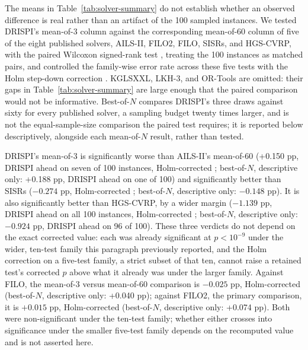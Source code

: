 The means in Table~\ref{tab:solver-summary} do not establish whether an observed difference is real rather than an artifact of the 100 sampled instances. We tested DRISPI's mean-of-3 column against the corresponding mean-of-60 column of five of the eight published solvers, AILS-II, FILO2, FILO, SISRs, and HGS-CVRP, with the paired Wilcoxon signed-rank test \citep{demsVarStatisticalComparisonsClassifiers}, treating the 100 instances as matched pairs, and controlled the family-wise error rate across these five tests with the Holm step-down correction \citep{demsVarStatisticalComparisonsClassifiers}. KGLSXXL, LKH-3, and OR-Tools are omitted: their gaps in Table~\ref{tab:solver-summary} are large enough that the paired comparison would not be informative. Best-of-$N$ compares DRISPI's three draws against sixty for every published solver, a sampling budget twenty times larger, and is not the equal-sample-size comparison the paired test requires; it is reported below descriptively, alongside each mean-of-$N$ result, rather than tested.

DRISPI's mean-of-3 is significantly worse than AILS-II's mean-of-60 (+0.150 pp, DRISPI ahead on seven of 100 instances, Holm-corrected ; best-of-$N$, descriptive only: +0.188 pp, DRISPI ahead on one of 100) and significantly better than SISRs ($-0.274$ pp, Holm-corrected ; best-of-$N$, descriptive only: $-0.148$ pp). It is also significantly better than HGS-CVRP, by a wider margin ($-1.139$ pp, DRISPI ahead on all 100 instances, Holm-corrected ; best-of-$N$, descriptive only: $-0.924$ pp, DRISPI ahead on 96 of 100). These three verdicts do not depend on the exact corrected value: each was already significant at $p < 10^{-9}$ under the wider, ten-test family this paragraph previously reported, and the Holm correction on a five-test family, a strict subset of that ten, cannot raise a retained test's corrected $p$ above what it already was under the larger family. Against FILO, the mean-of-3 versus mean-of-60 comparison is $-0.025$ pp, Holm-corrected  (best-of-$N$, descriptive only: +0.040 pp); against FILO2, the primary comparison, it is $+0.015$ pp, Holm-corrected  (best-of-$N$, descriptive only: +0.074 pp). Both were non-significant under the ten-test family; whether either crosses into significance under the smaller five-test family depends on the recomputed value and is not asserted here.


